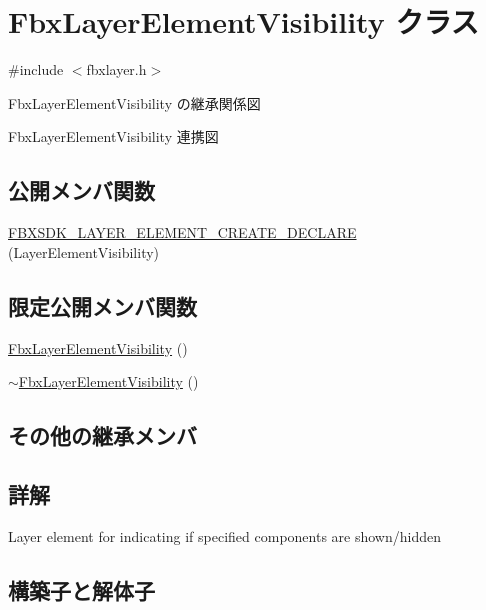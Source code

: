 \hypertarget{class_fbx_layer_element_visibility}{}\section{Fbx\+Layer\+Element\+Visibility クラス}
\label{class_fbx_layer_element_visibility}


{\ttfamily \#include $<$fbxlayer.\+h$>$}



Fbx\+Layer\+Element\+Visibility の継承関係図


Fbx\+Layer\+Element\+Visibility 連携図
\subsection*{公開メンバ関数}
\begin{DoxyCompactItemize}
\item 
\hyperlink{class_fbx_layer_element_visibility_aeaf11f053c06571e47ffd0e913e963aa}{F\+B\+X\+S\+D\+K\+\_\+\+L\+A\+Y\+E\+R\+\_\+\+E\+L\+E\+M\+E\+N\+T\+\_\+\+C\+R\+E\+A\+T\+E\+\_\+\+D\+E\+C\+L\+A\+RE} (Layer\+Element\+Visibility)
\end{DoxyCompactItemize}
\subsection*{限定公開メンバ関数}
\begin{DoxyCompactItemize}
\item 
\hyperlink{class_fbx_layer_element_visibility_a119e34ab13066e7d602a4e2a1594627c}{Fbx\+Layer\+Element\+Visibility} ()
\item 
\hyperlink{class_fbx_layer_element_visibility_a3d169145ba6514ea1b9b7a052c12d197}{$\sim$\+Fbx\+Layer\+Element\+Visibility} ()
\end{DoxyCompactItemize}
\subsection*{その他の継承メンバ}


\subsection{詳解}
Layer element for indicating if specified components are shown/hidden 

\subsection{構築子と解体子}
\mbox{\label{class_fbx_layer_element_visibility_a119e34ab13066e7d602a4e2a1594627c}} 
